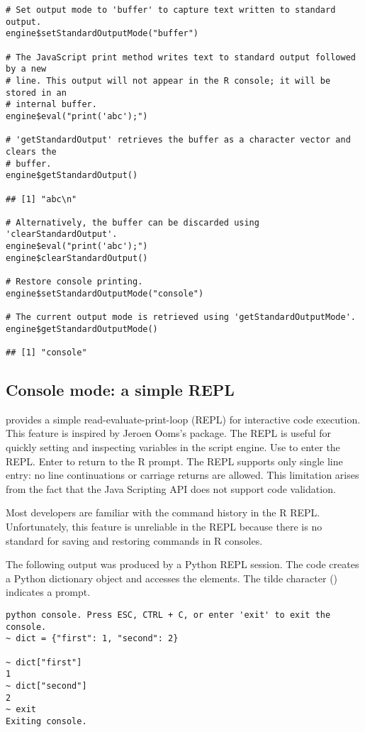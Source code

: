 \begin{verbatim}
# Set output mode to 'buffer' to capture text written to standard output.
engine$setStandardOutputMode("buffer")

# The JavaScript print method writes text to standard output followed by a new
# line. This output will not appear in the R console; it will be stored in an
# internal buffer.
engine$eval("print('abc');")

# 'getStandardOutput' retrieves the buffer as a character vector and clears the
# buffer.
engine$getStandardOutput()

## [1] "abc\n"

# Alternatively, the buffer can be discarded using 'clearStandardOutput'.
engine$eval("print('abc');")
engine$clearStandardOutput()

# Restore console printing.
engine$setStandardOutputMode("console")

# The current output mode is retrieved using 'getStandardOutputMode'.
engine$getStandardOutputMode()

## [1] "console"
\end{verbatim}

\subsection{Console mode: a simple REPL}

 provides a simple read-evaluate-print-loop (REPL) for interactive code execution. This feature is inspired by Jeroen Ooms's  package. The REPL is useful for quickly setting and inspecting variables in the script engine. Use  to enter the REPL. Enter  to return to the R prompt. The REPL supports only single line entry: no line continuations or carriage returns are allowed. This limitation arises from the fact that the Java Scripting API does not support code validation.

Most developers are familiar with the command history in the R REPL.  Unfortunately, this feature is unreliable in the  REPL because there is no standard for saving and restoring commands in R consoles.

The following output was produced by a Python REPL session. The code creates a Python dictionary object and accesses the elements. The tilde character (\samp{$\sim$}) indicates a prompt.

\begin{verbatim}
python console. Press ESC, CTRL + C, or enter 'exit' to exit the console.
~ dict = {"first": 1, "second": 2}

~ dict["first"]
1
~ dict["second"]
2
~ exit
Exiting console.
\end{verbatim}

